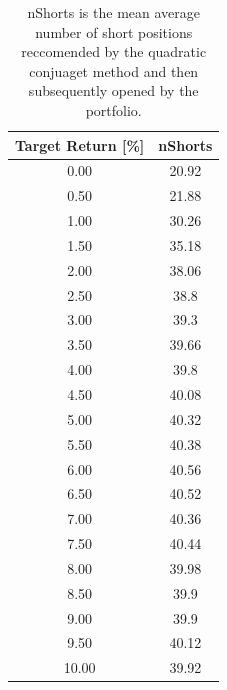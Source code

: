\documentclass{article}
\begin{document}
\begin{center}{
	\begin{table}[H]
		\centering
		\begin{tabular}{|c c |} 
			\hline
			Target Return [\%] & nShorts \\ [0.5ex] \hline \hline
					0.00	& 20.92 \\ \hline
					0.50 	& 21.88 \\ \hline
					1.00 	& 30.26 \\ \hline
					1.50	 & 35.18 \\ \hline
					2.00 	& 38.06 \\ \hline
					2.50 	& 38.8 \\ \hline
					3.00 	& 39.3 \\ \hline
					3.50 	& 39.66 \\ \hline
					4.00 	& 39.8 \\ \hline
					4.50	 & 40.08 \\ \hline
					5.00	& 40.32 \\ \hline
					5.50 	& 40.38 \\ \hline
					6.00 	& 40.56 \\ \hline
					6.50 	& 40.52 \\ \hline
					7.00 	& 40.36 \\ \hline
					7.50 	& 40.44 \\ \hline
					8.00	& 39.98 \\ \hline
					8.50 	& 39.9 \\ \hline
					9.00	& 39.9 \\ \hline
					9.50 	& 40.12 \\ \hline
					10.00	& 39.92 \\ [1ex] \hline
		\end{tabular}
		\caption{nShorts is the mean average number of short positions reccomended by the quadratic conjuaget method and then subsequently opened by the portfolio.}
		\label{table:nShorts}
	\end{table}
}
\end{center}
\end{document}
